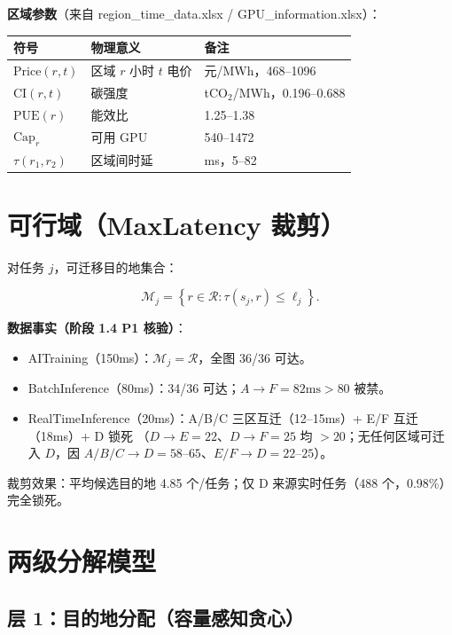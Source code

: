 \documentclass{internal-report}
\begin{document}
\textbf{区域参数}（来自 region\_time\_data.xlsx / GPU\_information.xlsx）：

\begin{center}
\footnotesize
\begin{tabular}{lll}
\toprule
符号 & 物理意义 & 备注 \\
\midrule
$\text{Price}(r,t)$ & 区域 $r$ 小时 $t$ 电价 & 元/MWh，468--1096 \\
$\text{CI}(r,t)$ & 碳强度 & tCO$_2$/MWh，0.196--0.688 \\
$\text{PUE}(r)$ & 能效比 & 1.25--1.38 \\
$\text{Cap}_r$ & 可用 GPU & 540--1472 \\
$\tau(r_1,r_2)$ & 区域间时延 & ms，5--82 \\
\bottomrule
\end{tabular}
\end{center}

\section{可行域（MaxLatency 裁剪）}

对任务 $j$，可迁移目的地集合：

\begin{equation}
  \mathcal{M}_j = \left\{ r \in \mathcal{R} : \tau(s_j, r) \le \ell_j \right\}.
  \label{eq:reach}
\end{equation}

\textbf{数据事实（阶段 1.4 P1 核验）}：
\begin{itemize}
  \item AITraining（150ms）：$\mathcal{M}_j = \mathcal{R}$，全图 36/36 可达。
  \item BatchInference（80ms）：34/36 可达；$A \to F = 82\text{ms} > 80$ 被禁。
  \item RealTimeInference（20ms）：A/B/C 三区互迁（12--15ms）+ E/F 互迁（18ms）+ D 锁死
        （$D\to E=22$、$D\to F=25$ 均 $>20$；无任何区域可迁入 $D$，因 $A/B/C\to D=58$--$65$、$E/F\to D=22$--$25$）。
\end{itemize}

裁剪效果：平均候选目的地 4.85 个/任务；仅 D 来源实时任务（488 个，0.98\%）完全锁死。

\section{两级分解模型}

\subsection{层 1：目的地分配（容量感知贪心）}
\end{document}
